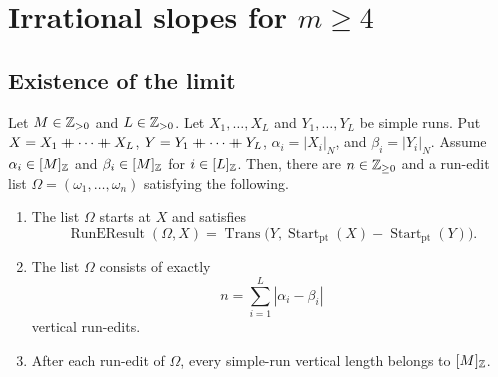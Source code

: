\section{Irrational slopes for \texorpdfstring{$m\ge4$}{m >= 4}}\label{sec:irrational}
\subsection{Existence of the limit}

\begin{lemma}\label{lem:vertical-length-comparison}
Let $M\in\mathbb Z_{>0}$ and $L\in\mathbb Z_{>0}$. Let $X_1,\ldots,X_L$ and $Y_1,\ldots,Y_L$ be simple runs.
Put $X=X_1\mathbin{+\mkern-10mu+} \cdots\mathbin{+\mkern-10mu+} X_L$, $Y=Y_1\mathbin{+\mkern-10mu+} \cdots\mathbin{+\mkern-10mu+} Y_L$, $\alpha_i=|X_i|_N$, and $\beta_i=|Y_i|_N$.
Assume $\alpha_i\in[M]_{\mathbb Z}$ and $\beta_i\in[M]_{\mathbb Z}$ for $i\in[L]_{\mathbb Z}$.
Then, there are $n\in\mathbb Z_{\ge0}$ and a run-edit list $\Omega=(\omega_1,\ldots,\omega_n)$ satisfying the following.
\begin{enumerate}
\item\label{c:vertical-comparison-target} The list $\Omega$ starts at $X$ and satisfies
\[
 \operatorname{RunEResult}(\Omega,X)
 =\operatorname{Trans}\bigl(Y,\operatorname{Start}_{\mathrm{pt}}(X)-\operatorname{Start}_{\mathrm{pt}}(Y)\bigr).
\]
\item\label{c:vertical-comparison-count} The list $\Omega$ consists of exactly
\[
 n=\sum_{i=1}^L|\alpha_i-\beta_i|
\]
vertical run-edits.
\item\label{c:vertical-comparison-lengths} After each run-edit of $\Omega$, every simple-run vertical length belongs to $[M]_{\mathbb Z}$.
\end{enumerate}
\end{lemma}
